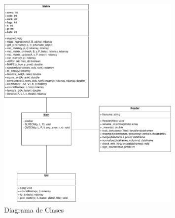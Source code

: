 \begin{figure}[h!t]
    \begin{center}
        \includegraphics[width=0.8\textwidth]{images/class_diagram.png}
        \caption{Diagrama de Clases}
        \label{fig:class_diagram}
    \end{center}
\end{figure}

